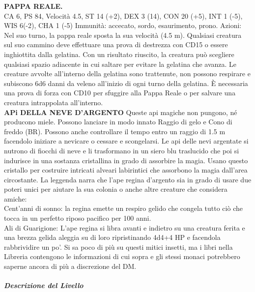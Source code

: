 \documentclass{article}
\begin{document}
    \textbf{PAPPA REALE.}\\
    CA 6, PS 84, Velocità 4.5, ST 14 (+2), DEX 3 (14),
    CON 20 (+5), INT 1 (-5), WIS 6(-2), CHA 1 (-5)
    Immunità: accecato, sordo, esaurimento, prono.
    Azioni: Nel suo turno, la pappa reale sposta la sua velocità (4.5 m). Qualsiasi creatura sul suo cammino deve effettuare una prova di destrezza con CD15 o essere inghiottita dalla gelatina. Con un risultato riuscito, la creatura può scegliere qualsiasi spazio adiacente in cui saltare per evitare la gelatina che avanza.
    Le creature avvolte all'interno della gelatina sono trattenute, non possono respirare e subiscono 6d6 danni da veleno all'inizio di ogni turno della gelatina.
    È necessaria una prova di forza con CD10 per sfuggire alla Pappa Reale o per salvare una creatura intrappolata all'interno.
    \\
    \textbf{APi DELLA NEVE D'ARGENTO}
    Queste api magiche non pungono, né producono miele. Possono lanciare in modo innato Raggio di gelo e Cono di freddo (BR).
Possono anche controllare il tempo entro un raggio di 1.5 m facendolo iniziare a nevicare o cessare e scongelarsi.
Le api delle nevi argentate si nutrono di fiocchi di neve e li trasformano in un siero blu traslucido che poi si indurisce in una sostanza cristallina in grado di assorbire la magia. Usano questo cristallo per costruire intricati alveari labirintici che assorbono la magia dall'area circostante.
La leggenda narra che l'ape regina d'argento sia in grado di usare due poteri unici per aiutare la sua colonia o anche altre creature che considera amiche:
\\Cent'anni di sonno: la regina emette un respiro gelido che congela tutto ciò che tocca in un perfetto riposo pacifico per 100 anni.
\\Ali di Guarigione: L'ape regina si libra avanti e indietro su una creatura ferita e una brezza gelida aleggia su di loro ripristinando 4d4+4 HP e facendola rabbrividire un po'.
Si sa poco di più su questi mitici insetti, ma i libri nella Libreria contengono le informazioni di cui sopra e gli stessi monaci potrebbero saperne ancora di più a discrezione del DM.

\subparagraph{Descrizione del Livello}
\end{document}
